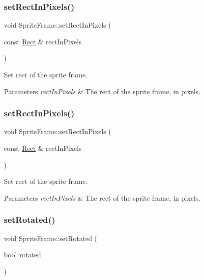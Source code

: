 \subsubsection{\texorpdfstring{set\+Rect\+In\+Pixels()}{setRectInPixels()}\hspace{0.1cm}{\footnotesize\ttfamily [1/2]}}
{\footnotesize\ttfamily void Sprite\+Frame\+::set\+Rect\+In\+Pixels (\begin{DoxyParamCaption}\item[{const \hyperlink{classRect}{Rect} \&}]{rect\+In\+Pixels }\end{DoxyParamCaption})}

Set rect of the sprite frame.


\begin{DoxyParams}{Parameters}
{\em rect\+In\+Pixels} & The rect of the sprite frame, in pixels. \\
\hline
\end{DoxyParams}
\mbox{\label{classSpriteFrame_a7807d131620f961dd2ebc379c856f132}} 
\subsubsection{\texorpdfstring{set\+Rect\+In\+Pixels()}{setRectInPixels()}\hspace{0.1cm}{\footnotesize\ttfamily [2/2]}}
{\footnotesize\ttfamily void Sprite\+Frame\+::set\+Rect\+In\+Pixels (\begin{DoxyParamCaption}\item[{const \hyperlink{classRect}{Rect} \&}]{rect\+In\+Pixels }\end{DoxyParamCaption})}

Set rect of the sprite frame.


\begin{DoxyParams}{Parameters}
{\em rect\+In\+Pixels} & The rect of the sprite frame, in pixels. \\
\hline
\end{DoxyParams}
\mbox{\label{classSpriteFrame_ac047765c8364710cf04c99e9b723c84c}} 
\subsubsection{\texorpdfstring{set\+Rotated()}{setRotated()}\hspace{0.1cm}{\footnotesize\ttfamily [1/2]}}
{\footnotesize\ttfamily void Sprite\+Frame\+::set\+Rotated (\begin{DoxyParamCaption}\item[{bool}]{rotated }\end{DoxyParamCaption})\hspace{0.3cm}{\ttfamily [inline]}}


